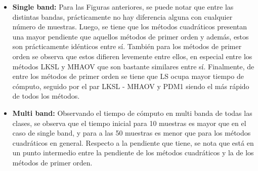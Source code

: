         
	
		
    
    
    
    \begin{itemize}
        \item \textbf{Single band:} Para las Figuras anteriores, se puede notar que entre las distintas bandas, prácticamente no hay diferencia alguna con cualquier número de muestras. Luego, se tiene que los métodos cuadráticos presentan una mayor pendiente que aquellos métodos de primer orden y además, estos son prácticamente idénticos entre sí. También para los métodos de primer orden se observa que estos difieren levemente entre ellos, en especial entre los métodos LKSL y MHAOV que son bastante similares entre sí. Finalmente, de entre los métodos de primer orden se tiene que LS ocupa mayor tiempo de cómputo, seguido por el par LKSL - MHAOV y PDM1 siendo el más rápido de todos los métodos.
        
        \item \textbf{Multi band:} Observando el tiempo de cómputo en multi banda de todas las clases, se observa que el tiempo inicial para 10 muestras es mayor que en el caso de single band, y para a las 50 muestras es menor que para los métodos cuadráticos en general. Respecto a la pendiente que tiene, se nota que está en un punto intermedio entre la pendiente de los métodos cuadráticos y la de los métodos de primer orden.
    \end{itemize}
		
	
	
	

	

	

	

	
	